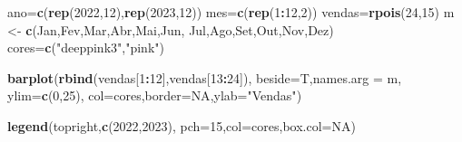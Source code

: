 \documentclass[
]{book}
\newenvironment{Shaded}{\begin{snugshade}}{\end{snugshade}}
\newcommand{\AttributeTok}[1]{\textcolor[rgb]{0.13,0.29,0.53}{#1}}
\newcommand{\ConstantTok}[1]{\textcolor[rgb]{0.56,0.35,0.01}{#1}}
\newcommand{\DecValTok}[1]{\textcolor[rgb]{0.00,0.00,0.81}{#1}}
\newcommand{\FunctionTok}[1]{\textcolor[rgb]{0.13,0.29,0.53}{\textbf{#1}}}
\newcommand{\NormalTok}[1]{#1}
\newcommand{\OtherTok}[1]{\textcolor[rgb]{0.56,0.35,0.01}{#1}}
\newcommand{\SpecialCharTok}[1]{\textcolor[rgb]{0.81,0.36,0.00}{\textbf{#1}}}
\newcommand{\StringTok}[1]{\textcolor[rgb]{0.31,0.60,0.02}{#1}}
\begin{document}
\begin{Shaded}
\begin{Highlighting}[]
\NormalTok{ano}\OtherTok{=}\FunctionTok{c}\NormalTok{(}\FunctionTok{rep}\NormalTok{(}\DecValTok{2022}\NormalTok{,}\DecValTok{12}\NormalTok{),}\FunctionTok{rep}\NormalTok{(}\DecValTok{2023}\NormalTok{,}\DecValTok{12}\NormalTok{))}
\NormalTok{mes}\OtherTok{=}\FunctionTok{c}\NormalTok{(}\FunctionTok{rep}\NormalTok{(}\DecValTok{1}\SpecialCharTok{:}\DecValTok{12}\NormalTok{,}\DecValTok{2}\NormalTok{))}
\NormalTok{vendas}\OtherTok{=}\FunctionTok{rpois}\NormalTok{(}\DecValTok{24}\NormalTok{,}\DecValTok{15}\NormalTok{)}
\NormalTok{m }\OtherTok{\textless{}{-}} \FunctionTok{c}\NormalTok{(}\StringTok{\textquotesingle{}Jan\textquotesingle{}}\NormalTok{,}\StringTok{\textquotesingle{}Fev\textquotesingle{}}\NormalTok{,}\StringTok{\textquotesingle{}Mar\textquotesingle{}}\NormalTok{,}\StringTok{\textquotesingle{}Abr\textquotesingle{}}\NormalTok{,}\StringTok{\textquotesingle{}Mai\textquotesingle{}}\NormalTok{,}\StringTok{\textquotesingle{}Jun\textquotesingle{}}\NormalTok{,}
       \StringTok{\textquotesingle{}Jul\textquotesingle{}}\NormalTok{,}\StringTok{\textquotesingle{}Ago\textquotesingle{}}\NormalTok{,}\StringTok{\textquotesingle{}Set\textquotesingle{}}\NormalTok{,}\StringTok{\textquotesingle{}Out\textquotesingle{}}\NormalTok{,}\StringTok{\textquotesingle{}Nov\textquotesingle{}}\NormalTok{,}\StringTok{\textquotesingle{}Dez\textquotesingle{}}\NormalTok{)}
\NormalTok{cores}\OtherTok{=}\FunctionTok{c}\NormalTok{(}\StringTok{"deeppink3"}\NormalTok{,}\StringTok{"pink"}\NormalTok{)}

\FunctionTok{barplot}\NormalTok{(}\FunctionTok{rbind}\NormalTok{(vendas[}\DecValTok{1}\SpecialCharTok{:}\DecValTok{12}\NormalTok{],vendas[}\DecValTok{13}\SpecialCharTok{:}\DecValTok{24}\NormalTok{]),}
        \AttributeTok{beside=}\NormalTok{T,}\AttributeTok{names.arg =}\NormalTok{ m, }\AttributeTok{ylim=}\FunctionTok{c}\NormalTok{(}\DecValTok{0}\NormalTok{,}\DecValTok{25}\NormalTok{),}
        \AttributeTok{col=}\NormalTok{cores,}\AttributeTok{border=}\ConstantTok{NA}\NormalTok{,}\AttributeTok{ylab=}\StringTok{"Vendas"}\NormalTok{)}

\FunctionTok{legend}\NormalTok{(}\StringTok{\textquotesingle{}topright\textquotesingle{}}\NormalTok{,}\FunctionTok{c}\NormalTok{(}\StringTok{\textquotesingle{}2022\textquotesingle{}}\NormalTok{,}\StringTok{\textquotesingle{}2023\textquotesingle{}}\NormalTok{),}
       \AttributeTok{pch=}\DecValTok{15}\NormalTok{,}\AttributeTok{col=}\NormalTok{cores,}\AttributeTok{box.col=}\ConstantTok{NA}\NormalTok{)}
\end{Highlighting}
\end{Shaded}
\end{document}
